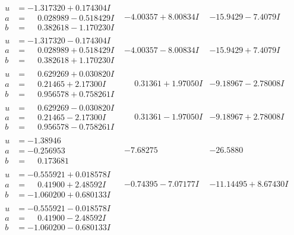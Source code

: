 \documentclass[1p]{elsarticle_modified}
\theoremstyle{definition}
\begin{document}
$$\begin{array}{c|c|c}
\begin{aligned}
u &= -1.317320 + 0.174304 I \\
a &= \phantom{-}0.028989 - 0.518429 I \\
b &= \phantom{-}0.382618 - 1.170230 I\end{aligned}
 & -4.00357 + 8.00834 I & -15.9429 - 7.4079 I \\ \hline\begin{aligned}
u &= -1.317320 - 0.174304 I \\
a &= \phantom{-}0.028989 + 0.518429 I \\
b &= \phantom{-}0.382618 + 1.170230 I\end{aligned}
 & -4.00357 - 8.00834 I & -15.9429 + 7.4079 I \\ \hline\begin{aligned}
u &= \phantom{-}0.629269 + 0.030820 I \\
a &= \phantom{-}0.21465 + 2.17300 I \\
b &= \phantom{-}0.956578 + 0.758261 I\end{aligned}
 & \phantom{-}0.31361 + 1.97050 I & -9.18967 - 2.78008 I \\ \hline\begin{aligned}
u &= \phantom{-}0.629269 - 0.030820 I \\
a &= \phantom{-}0.21465 - 2.17300 I \\
b &= \phantom{-}0.956578 - 0.758261 I\end{aligned}
 & \phantom{-}0.31361 - 1.97050 I & -9.18967 + 2.78008 I \\ \hline\begin{aligned}
u &= -1.38946\phantom{ +0.000000I} \\
a &= -0.256953\phantom{ +0.000000I} \\
b &= \phantom{-}0.173681\phantom{ +0.000000I}\end{aligned}
 & -7.68275\phantom{ +0.000000I} & -26.5880\phantom{ +0.000000I} \\ \hline\begin{aligned}
u &= -0.555921 + 0.018578 I \\
a &= \phantom{-}0.41900 + 2.48592 I \\
b &= -1.060200 + 0.680133 I\end{aligned}
 & -0.74395 - 7.07177 I & -11.14495 + 8.67430 I \\ \hline\begin{aligned}
u &= -0.555921 - 0.018578 I \\
a &= \phantom{-}0.41900 - 2.48592 I \\
b &= -1.060200 - 0.680133 I\end{aligned}

\end{array}$$
\end{document}
